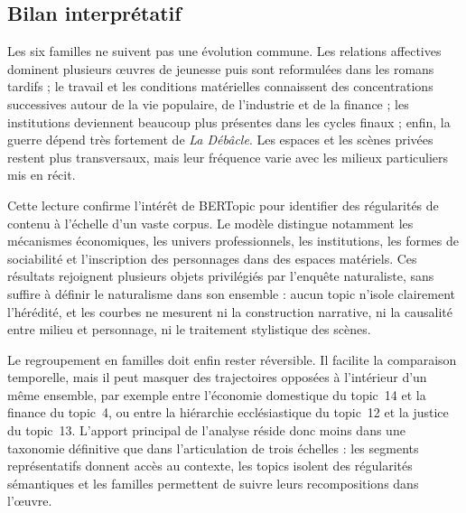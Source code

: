 \subsection{Bilan interprétatif}

Les six familles ne suivent pas une évolution commune. Les relations affectives dominent plusieurs œuvres de jeunesse puis sont reformulées dans les romans tardifs ; le travail et les conditions matérielles connaissent des concentrations successives autour de la vie populaire, de l'industrie et de la finance ; les institutions deviennent beaucoup plus présentes dans les cycles finaux ; enfin, la guerre dépend très fortement de \textit{La Débâcle}. Les espaces et les scènes privées restent plus transversaux, mais leur fréquence varie avec les milieux particuliers mis en récit.

Cette lecture confirme l'intérêt de BERTopic pour identifier des régularités de contenu à l'échelle d'un vaste corpus. Le modèle distingue notamment les mécanismes économiques, les univers professionnels, les institutions, les formes de sociabilité et l'inscription des personnages dans des espaces matériels. Ces résultats rejoignent plusieurs objets privilégiés par l'enquête naturaliste, sans suffire à définir le naturalisme dans son ensemble : aucun topic n'isole clairement l'hérédité, et les courbes ne mesurent ni la construction narrative, ni la causalité entre milieu et personnage, ni le traitement stylistique des scènes.

Le regroupement en familles doit enfin rester réversible. Il facilite la comparaison temporelle, mais il peut masquer des trajectoires opposées à l'intérieur d'un même ensemble, par exemple entre l'économie domestique du topic~14 et la finance du topic~4, ou entre la hiérarchie ecclésiastique du topic~12 et la justice du topic~13. L'apport principal de l'analyse réside donc moins dans une taxonomie définitive que dans l'articulation de trois échelles : les segments représentatifs donnent accès au contexte, les topics isolent des régularités sémantiques et les familles permettent de suivre leurs recompositions dans l'œuvre.
